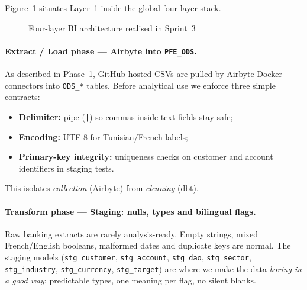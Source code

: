 Figure~\ref{fig:elt_four_layers} situates Layer~1 inside the global four-layer
stack.

\begin{figure}[H]
\centering
{}
\caption{Four-layer BI architecture realised in Sprint~3}
\label{fig:elt_four_layers}
\end{figure}

\paragraph{Extract / Load phase --- Airbyte into \texttt{PFE\_ODS}.}
As described in Phase~1, GitHub-hosted CSVs are pulled by Airbyte Docker
connectors into \texttt{ODS\_*} tables. Before analytical use we enforce three
simple contracts:
\begin{itemize}
    \item \textbf{Delimiter:} pipe (\texttt{|}) so commas inside text fields stay safe;
    \item \textbf{Encoding:} UTF-8 for Tunisian/French labels;
    \item \textbf{Primary-key integrity:} uniqueness checks on customer and account
          identifiers in staging tests.
\end{itemize}
This isolates \emph{collection} (Airbyte) from \emph{cleaning} (dbt).

\paragraph{Transform phase --- Staging: nulls, types and bilingual flags.}
\label{sec:staging_cleaning}
Raw banking extracts are rarely analysis-ready. Empty strings, mixed French/English
booleans, malformed dates and duplicate keys are normal. The staging models
(\texttt{stg\_customer}, \texttt{stg\_account}, \texttt{stg\_dao},
\texttt{stg\_sector}, \texttt{stg\_industry}, \texttt{stg\_currency},
\texttt{stg\_target}) are where we make the data \emph{boring in a good way}:
predictable types, one meaning per flag, no silent blanks.

